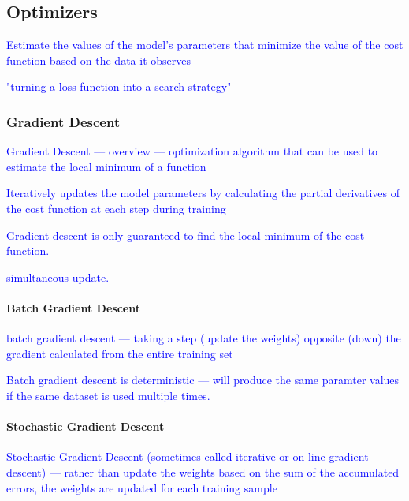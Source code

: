 \subsection{Optimizers}

\textcolor{blue}{Estimate the values of the model's parameters that minimize the value of the cost function based on the data it observes}

\textcolor{blue}{"turning a loss function into a search strategy"}


\subsubsection{Gradient Descent}

\textcolor{blue}{Gradient Descent --- overview --- optimization algorithm that can be used to estimate the local minimum of a function}

\textcolor{blue}{Iteratively updates the model parameters by calculating the partial derivatives of the cost function at each step during training}

\textcolor{blue}{Gradient descent is only guaranteed to find the local minimum of the cost function.}

\textcolor{blue}{simultaneous update.}


\paragraph{Batch Gradient Descent}

\textcolor{blue}{batch gradient descent --- taking a step (update the weights) opposite (down) the gradient calculated from the entire training set}

\textcolor{blue}{Batch gradient descent is deterministic --- will produce the same paramter values if the same dataset is used multiple times.}


\paragraph{Stochastic Gradient Descent}

\textcolor{blue}{Stochastic Gradient Descent (sometimes called iterative or on-line gradient descent) --- rather than update the weights based on the sum of the accumulated errors, the weights are updated for each training sample}

